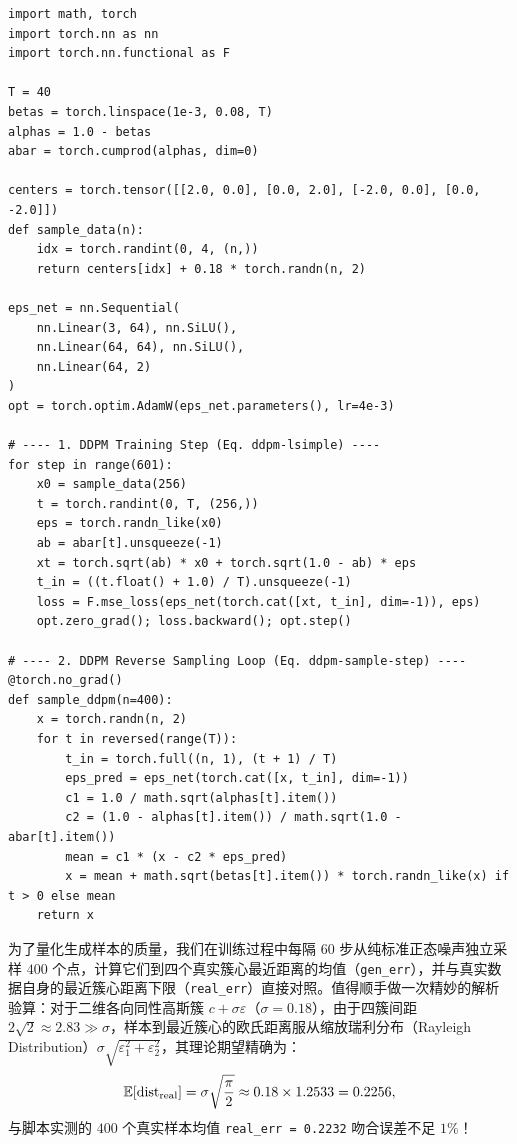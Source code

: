 \begin{lstlisting}[caption={纯 PyTorch 二维四模态环 DDPM 核心训练与逆向采样代码（与 \texttt{code/vol5\_experiments.py} 完全一致）},label={lst:ddpm-2d}]
import math, torch
import torch.nn as nn
import torch.nn.functional as F

T = 40
betas = torch.linspace(1e-3, 0.08, T)
alphas = 1.0 - betas
abar = torch.cumprod(alphas, dim=0)

centers = torch.tensor([[2.0, 0.0], [0.0, 2.0], [-2.0, 0.0], [0.0, -2.0]])
def sample_data(n):
    idx = torch.randint(0, 4, (n,))
    return centers[idx] + 0.18 * torch.randn(n, 2)

eps_net = nn.Sequential(
    nn.Linear(3, 64), nn.SiLU(),
    nn.Linear(64, 64), nn.SiLU(),
    nn.Linear(64, 2)
)
opt = torch.optim.AdamW(eps_net.parameters(), lr=4e-3)

# ---- 1. DDPM Training Step (Eq. ddpm-lsimple) ----
for step in range(601):
    x0 = sample_data(256)
    t = torch.randint(0, T, (256,))
    eps = torch.randn_like(x0)
    ab = abar[t].unsqueeze(-1)
    xt = torch.sqrt(ab) * x0 + torch.sqrt(1.0 - ab) * eps
    t_in = ((t.float() + 1.0) / T).unsqueeze(-1)
    loss = F.mse_loss(eps_net(torch.cat([xt, t_in], dim=-1)), eps)
    opt.zero_grad(); loss.backward(); opt.step()

# ---- 2. DDPM Reverse Sampling Loop (Eq. ddpm-sample-step) ----
@torch.no_grad()
def sample_ddpm(n=400):
    x = torch.randn(n, 2)
    for t in reversed(range(T)):
        t_in = torch.full((n, 1), (t + 1) / T)
        eps_pred = eps_net(torch.cat([x, t_in], dim=-1))
        c1 = 1.0 / math.sqrt(alphas[t].item())
        c2 = (1.0 - alphas[t].item()) / math.sqrt(1.0 - abar[t].item())
        mean = c1 * (x - c2 * eps_pred)
        x = mean + math.sqrt(betas[t].item()) * torch.randn_like(x) if t > 0 else mean
    return x
\end{lstlisting}

为了量化生成样本的质量，我们在训练过程中每隔 $60$ 步从纯标准正态噪声独立采样 $400$ 个点，计算它们到四个真实簇心最近距离的均值（\texttt{gen\_err}），并与真实数据自身的最近簇心距离下限（\texttt{real\_err}）直接对照。值得顺手做一次精妙的解析验算：对于二维各向同性高斯簇 $c + \sigma \varepsilon$（$\sigma = 0.18$），由于四簇间距 $2\sqrt{2} \approx 2.83 \gg \sigma$，样本到最近簇心的欧氏距离服从缩放瑞利分布（Rayleigh Distribution）$\sigma\sqrt{\varepsilon_1^2 + \varepsilon_2^2}$，其理论期望精确为：
\[
  \mathbb{E}[\text{dist}_{\text{real}}] = \sigma \sqrt{\frac{\pi}{2}} \approx 0.18 \times 1.2533 = 0.2256,
\]
与脚本实测的 $400$ 个真实样本均值 \texttt{real\_err = 0.2232} 吻合误差不足 $1\%$！

